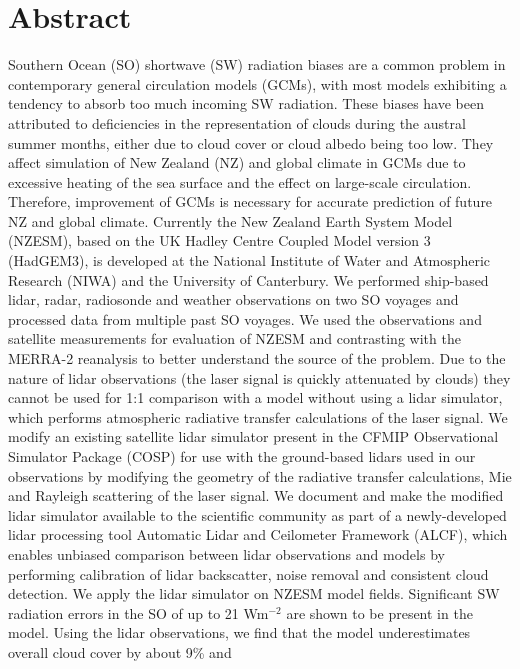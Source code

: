 \section*{Abstract}

\noindent
Southern Ocean (SO) shortwave (SW) radiation biases are a common
problem in contemporary general circulation models (GCMs), with most
models exhibiting a tendency to absorb too much incoming SW radiation.
These biases have been attributed to deficiencies in the representation of
clouds during the austral summer months, either due to cloud cover or cloud
albedo being too low. They affect simulation of New Zealand (NZ) and global
climate in GCMs due to excessive heating of the sea surface and the effect on
large-scale circulation. Therefore, improvement of GCMs is necessary for
accurate prediction of future NZ and global climate. Currently the New
Zealand Earth System Model (NZESM), based on the UK Hadley Centre
Coupled Model version 3 (HadGEM3), is developed at the National Institute
of Water and Atmospheric Research (NIWA) and the University of
Canterbury. We performed ship-based lidar, radar, radiosonde and weather
observations on two SO voyages and processed data from multiple past SO
voyages. We used the observations and satellite measurements for
evaluation of NZESM and contrasting with the MERRA-2 reanalysis to better
understand the source of the problem. Due to the nature of lidar
observations (the laser signal is quickly attenuated by clouds) they cannot be
used for 1:1 comparison with a model without using a lidar simulator, which
performs atmospheric radiative transfer calculations of the laser signal. We
modify an existing satellite lidar simulator present in the CFMIP
Observational Simulator Package (COSP) for use with the ground-based lidars
used in our observations by modifying the geometry of the radiative transfer
calculations, Mie and Rayleigh scattering of the laser signal. We document
and make the modified lidar simulator available to the scientific community
as part of a newly-developed lidar processing tool Automatic Lidar and
Ceilometer Framework (ALCF), which enables unbiased comparison between
lidar observations and models by performing calibration of lidar backscatter,
noise removal and consistent cloud detection. We apply the lidar simulator
on NZESM model fields. Significant SW radiation errors in the SO of up to 21
Wm$^{-2}$ are shown to be present in the model. Using the lidar observations,
we find that the model underestimates overall cloud cover by about 9\% and
